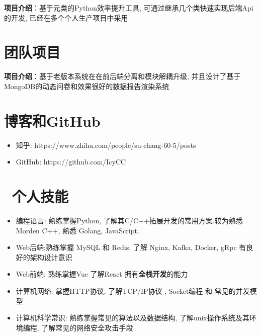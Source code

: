 \documentclass{resume}
\begin{document}
  \begin{onehalfspacing}
  \textbf{项目介绍}：\quad 基于元类的Python效率提升工具, 可通过继承几个类快速实现后端Api的开发, 已经在多个个人生产项目中采用
  \end{onehalfspacing}

  \section{\faObjectGroup 团队项目}
  \begin{onehalfspacing}
    \textbf{项目介绍}：\quad 基于老版本系统在在前后端分离和模块解耦升级, 并且设计了基于MongoDB的动态问卷和效果很好的数据报告渲染系统
  \end{onehalfspacing}


  \section{\faRssSquare 博客和GitHub}
  \begin{itemize}[parsep=0.5ex]
    \item 知乎: https://www.zhihu.com/people/su-chang-60-5/posts
    \item GitHub: https://github.com/IcyCC
  \end{itemize}

  \section{\faCogs\ 个人技能}
  \begin{itemize}[parsep=0.5ex]
    \item 编程语言: 熟练掌握Python, 了解其C/C++拓展开发的常用方案.较为熟悉 Morden C++, 熟悉 Golang, JavaScript.
    \item Web后端:熟练掌握 MySQL 和 Redis,
    了解 Nginx, Kafka,  Docker, gRpc
    有良好的架构设计意识
    \item Web前端: 熟练掌握Vue 了解React 拥有\textbf{全栈开发}的能力
    \item 计算机网络: 掌握HTTP协议, 了解TCP/IP协议 , Socket编程 和 常见的并发模型 
    \item 计算机科学常识: 熟练掌握常见的算法以及数据结构,
    了解unix操作系统及其环境编程, 
    了解常见的网络安全攻击手段
  \end{itemize}


  
\end{document}

